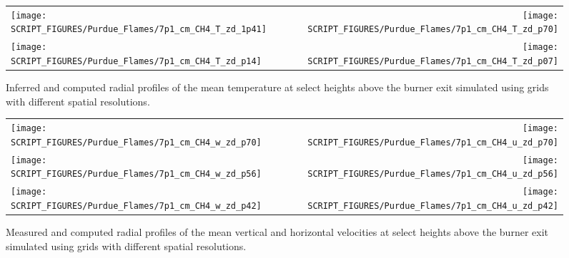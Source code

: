 \begin{figure}[p]
\begin{tabular*}{\textwidth}{l@{\extracolsep{\fill}}r}
\texttt{[image: SCRIPT\_FIGURES/Purdue\_Flames/7p1\_cm\_CH4\_T\_zd\_1p41]} &
\texttt{[image: SCRIPT\_FIGURES/Purdue\_Flames/7p1\_cm\_CH4\_T\_zd\_p70]} \\
\texttt{[image: SCRIPT\_FIGURES/Purdue\_Flames/7p1\_cm\_CH4\_T\_zd\_p14]} &
\texttt{[image: SCRIPT\_FIGURES/Purdue\_Flames/7p1\_cm\_CH4\_T\_zd\_p07]}
\end{tabular*}
\caption[Purdue 7.1 cm methane flame mean temperature profiles]
{Inferred \cite{Xin:CF2005} and computed radial profiles of the mean temperature at select heights above the burner exit simulated using grids with different spatial resolutions.}
\label{Purdue_7p1_CH4_temperature}
\end{figure}


\begin{figure}[p]
\begin{tabular*}{\textwidth}{l@{\extracolsep{\fill}}r}
\texttt{[image: SCRIPT\_FIGURES/Purdue\_Flames/7p1\_cm\_CH4\_w\_zd\_p70]} &
\texttt{[image: SCRIPT\_FIGURES/Purdue\_Flames/7p1\_cm\_CH4\_u\_zd\_p70]} \\
\texttt{[image: SCRIPT\_FIGURES/Purdue\_Flames/7p1\_cm\_CH4\_w\_zd\_p56]} &
\texttt{[image: SCRIPT\_FIGURES/Purdue\_Flames/7p1\_cm\_CH4\_u\_zd\_p56]} \\
\texttt{[image: SCRIPT\_FIGURES/Purdue\_Flames/7p1\_cm\_CH4\_w\_zd\_p42]} &
\texttt{[image: SCRIPT\_FIGURES/Purdue\_Flames/7p1\_cm\_CH4\_u\_zd\_p42]}
\end{tabular*}
\caption[Purdue 7.1 cm methane flame mean velocity profiles]
{Measured \cite{Zhou:CS1998} and computed radial profiles of the mean vertical and horizontal velocities at select heights above the burner exit simulated using grids with different spatial resolutions.}
\label{Purdue_7p1_CH4_vertical_velocity}
\end{figure}



